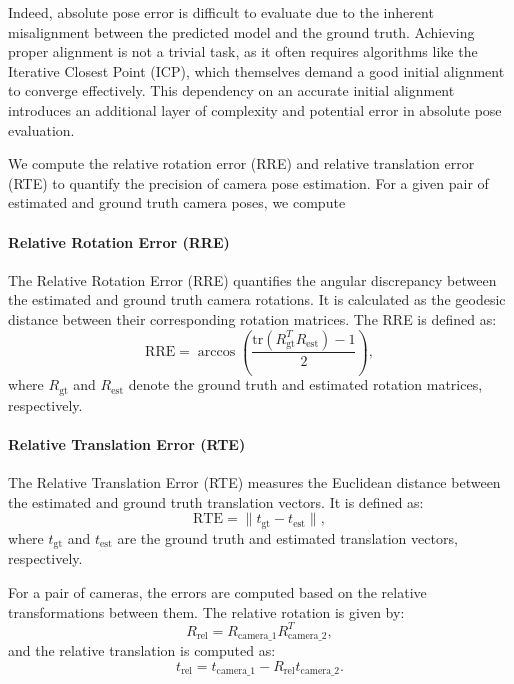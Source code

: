 Indeed, absolute pose error is difficult to evaluate due to the inherent misalignment between the predicted model and the ground truth. 
Achieving proper alignment is not a trivial task, as it often requires algorithms like the Iterative Closest Point (ICP), which themselves demand a good initial alignment to converge effectively. 
This dependency on an accurate initial alignment introduces an additional layer of complexity and potential error in absolute pose evaluation.


We compute the relative rotation error (RRE) and relative translation error (RTE) to quantify the precision of camera pose estimation.
For a given pair of estimated and ground truth camera poses, we compute 


\paragraph{Relative Rotation Error (RRE)}  
The Relative Rotation Error (RRE) quantifies the angular discrepancy between the estimated and ground truth camera rotations. It is calculated as the geodesic distance between their corresponding rotation matrices. The RRE is defined as:  
\begin{equation}  
    \text{RRE} = \arccos\left(\frac{\text{tr}(R_{\text{gt}}^T R_{\text{est}}) - 1}{2}\right),  
\end{equation}  
where \( R_{\text{gt}} \) and \( R_{\text{est}} \) denote the ground truth and estimated rotation matrices, respectively.

\paragraph{Relative Translation Error (RTE)}  
The Relative Translation Error (RTE) measures the Euclidean distance between the estimated and ground truth translation vectors. It is defined as:  
\begin{equation}  
    \text{RTE} = \lVert t_{\text{gt}} - t_{\text{est}} \rVert,  
\end{equation}  
where \( t_{\text{gt}} \) and \( t_{\text{est}} \) are the ground truth and estimated translation vectors, respectively.

For a pair of cameras, the errors are computed based on the relative transformations between them. The relative rotation is given by:  
\begin{equation}  
    R_{\text{rel}} = R_{\text{camera\_1}} R_{\text{camera\_2}}^T,  
\end{equation}  
and the relative translation is computed as:  
\begin{equation}  
    t_{\text{rel}} = t_{\text{camera\_1}} - R_{\text{rel}} t_{\text{camera\_2}}.  
\end{equation}  

